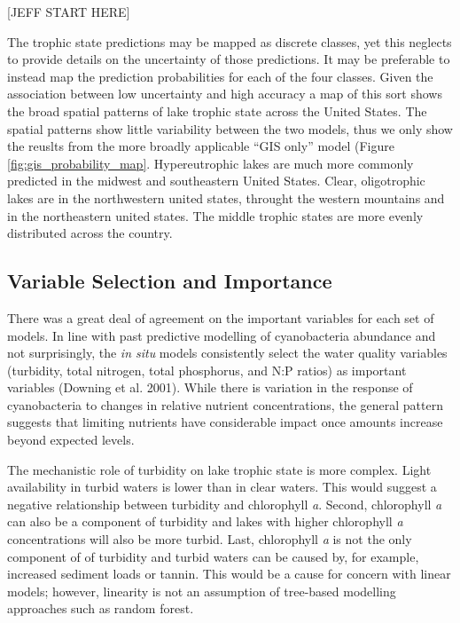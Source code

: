 \documentclass[11pt,]{article}
\begin{document}
{[}JEFF START HERE{]}

The trophic state predictions may be mapped as discrete classes, yet
this neglects to provide details on the uncertainty of those
predictions. It may be preferable to instead map the prediction
probabilities for each of the four classes. Given the association
between low uncertainty and high accuracy a map of this sort shows the
broad spatial patterns of lake trophic state across the United States.
The spatial patterns show little variability between the two models,
thus we only show the reuslts from the more broadly applicable ``GIS
only'' model (Figure \ref{fig:gis_probability_map}. Hypereutrophic lakes
are much more commonly predicted in the midwest and southeastern United
States. Clear, oligotrophic lakes are in the northwestern united states,
throught the western mountains and in the northeastern united states.
The middle trophic states are more evenly distributed across the
country.

\subsection{Variable Selection and
Importance}\label{variable-selection-and-importance}

There was a great deal of agreement on the important variables for each
set of models. In line with past predictive modelling of cyanobacteria
abundance and not surprisingly, the \emph{in situ} models consistently
select the water quality variables (turbidity, total nitrogen, total
phosphorus, and N:P ratios) as important variables (Downing et al.
2001). While there is variation in the response of cyanobacteria to
changes in relative nutrient concentrations, the general pattern
suggests that limiting nutrients have considerable impact once amounts
increase beyond expected levels.

The mechanistic role of turbidity on lake trophic state is more complex.
Light availability in turbid waters is lower than in clear waters. This
would suggest a negative relationship between turbidity and chlorophyll
\emph{a}. Second, chlorophyll \emph{a} can also be a component of
turbidity and lakes with higher chlorophyll \emph{a} concentrations will
also be more turbid. Last, chlorophyll \emph{a} is not the only
component of of turbidity and turbid waters can be caused by, for
example, increased sediment loads or tannin. This would be a cause for
concern with linear models; however, linearity is not an assumption of
tree-based modelling approaches such as random forest.
\end{document}
